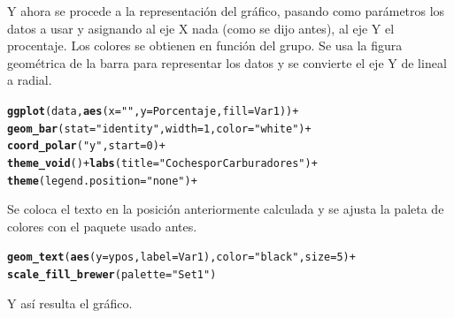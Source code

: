 \documentclass{article}\usepackage[]{graphicx}\usepackage[]{color}
\makeatletter
\newcommand{\hlnum}[1]{\textcolor[rgb]{0.686,0.059,0.569}{#1}}%
\newcommand{\hlstr}[1]{\textcolor[rgb]{0.192,0.494,0.8}{#1}}%
\newcommand{\hlopt}[1]{\textcolor[rgb]{0,0,0}{#1}}%
\newcommand{\hlstd}[1]{\textcolor[rgb]{0.345,0.345,0.345}{#1}}%
\newcommand{\hlkwc}[1]{\textcolor[rgb]{0.333,0.667,0.333}{#1}}%
\newcommand{\hlkwd}[1]{\textcolor[rgb]{0.737,0.353,0.396}{\textbf{#1}}}%
\newenvironment{kframe}{%
 \def\at@end@of@kframe{}%
 \ifinner\ifhmode%
  \def\at@end@of@kframe{\end{minipage}}%
  \begin{minipage}{\columnwidth}%
 \fi\fi%
 \def\FrameCommand##1{\hskip\@totalleftmargin \hskip-\fboxsep
 \colorbox{shadecolor}{##1}\hskip-\fboxsep
     \hskip-\linewidth \hskip-\@totalleftmargin \hskip\columnwidth}%
 \MakeFramed {\advance\hsize-\width
   \@totalleftmargin\z@ \linewidth\hsize
   \@setminipage}}%
 {\par\unskip\endMakeFramed%
 \at@end@of@kframe}
\newenvironment{knitrout}{}{} %
\makeatother
\begin{document}
Y ahora se procede a la representaci\'on del gr\'afico, pasando como par\'ametros los datos a usar y asignando al eje X nada (como se dijo antes), al eje Y el procentaje. Los colores se obtienen en funci\'on del grupo. Se usa la figura geom\'etrica de la barra para representar los datos y se convierte el eje Y de lineal a radial.
\begin{knitrout}
\color{fgcolor}\begin{kframe}
\begin{alltt}
\hlkwd{ggplot}(data, \hlkwd{aes}(x=\hlstr{""}, y=Porcentaje, fill=Var1)) +
  \hlkwd{geom_bar}(stat=\hlstr{"identity"}, width=1, color=\hlstr{"white"}) +
  \hlkwd{coord_polar}(\hlstr{"y"}, start=0) +
  \hlkwd{theme_void}() + \hlkwd{labs}(title=\hlstr{"Coches por Carburadores"}) +
  \hlkwd{theme}(legend.position=\hlstr{"none"}) +
\end{alltt}
\end{kframe}
\end{knitrout}
Se coloca el texto en la posici\'on anteriormente calculada y se ajusta la paleta de colores con el paquete usado antes.
\begin{knitrout}
\color{fgcolor}\begin{kframe}
\begin{alltt}
  \hlkwd{geom_text}\hlstd{(}\hlkwd{aes}\hlstd{(}\hlkwc{y} \hlstd{= ypos,} \hlkwc{label} \hlstd{= Var1),} \hlkwc{color} \hlstd{=} \hlstr{"black"}\hlstd{,} \hlkwc{size}\hlstd{=}\hlnum{5}\hlstd{)} \hlopt{+}
  \hlkwd{scale_fill_brewer}\hlstd{(}\hlkwc{palette}\hlstd{=}\hlstr{"Set1"}\hlstd{)}
\end{alltt}
\end{kframe}
\end{knitrout}
\clearpage
Y as\'i resulta el gr\'afico.
\end{document}
